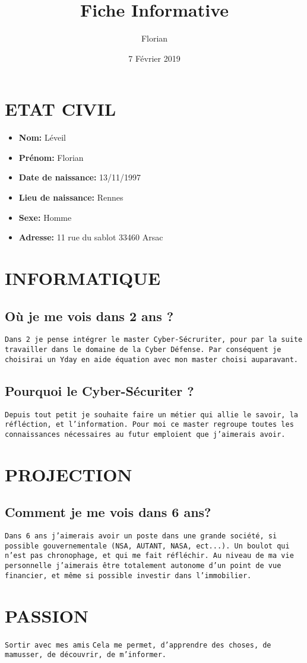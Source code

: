 \documentclass{article}
\title{Fiche Informative}
\author{Florian}
\date{7 Février 2019}
\begin{document}
\maketitle

\section{ETAT CIVIL}
\begin{itemize}
    \item\textbf{Nom:} Léveil
    \item\textbf{Prénom:} Florian
    \item\textbf{Date de naissance:} 13/11/1997
    \item\textbf{Lieu de naissance:} Rennes
    \item\textbf{Sexe:} Homme
    \item\textbf{Adresse:} 11 rue du sablot 33460 Arsac

\end{itemize}

\section{INFORMATIQUE}
\subsection{Où je me vois dans 2 ans ?}

\texttt{Dans 2 je pense intégrer le master Cyber-Sécruriter, pour par la suite travailler dans le domaine de la Cyber Défense.
Par conséquent je choisirai un Yday en aide équation avec mon master choisi auparavant.}

\subsection{Pourquoi le Cyber-Sécuriter ?}

\texttt{Depuis tout petit je souhaite faire un métier qui allie le savoir, la réfléction, et l'information. Pour moi ce master regroupe toutes les connaissances nécessaires au futur emploient que j'aimerais avoir.}

\section{PROJECTION}
\subsection{Comment je me vois dans 6 ans?}

\texttt{Dans 6 ans j'aimerais avoir un poste dans une grande société, si possible gouvernementale (NSA, AUTANT, NASA, ect...). Un boulot qui n'est pas chronophage, et qui me fait réfléchir.
Au niveau de ma vie personnelle j'aimerais être totalement autonome d'un point de vue financier, et même si possible investir dans l'immobilier.}

\section{PASSION}
\texttt{Sortir avec mes amis}
\texttt{Cela me permet, d'apprendre des choses, de mamusser, de découvrir, de m'informer.}
\end{document}
